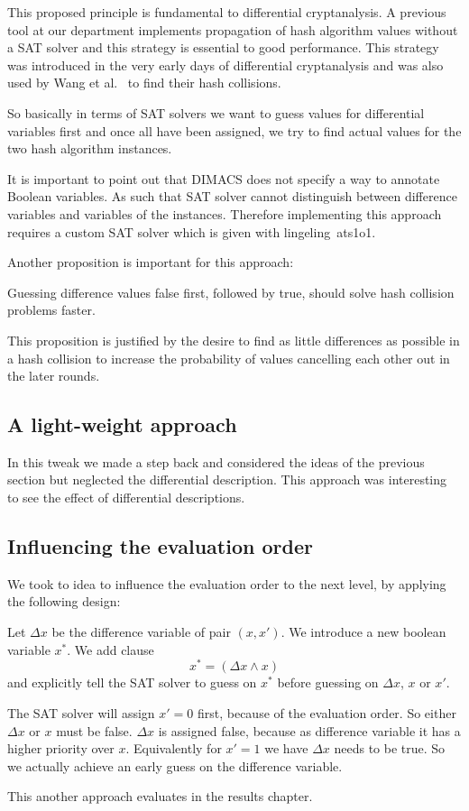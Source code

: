 This proposed principle is fundamental to differential cryptanalysis. A previous tool
at our department implements propagation of hash algorithm values without a SAT solver
and this strategy is essential to good performance. This strategy was introduced
in the very early days of differential cryptanalysis and was also used by Wang et
al.~\cite{wang2004} to find their hash collisions.

So basically in terms of SAT solvers we want to guess values for differential variables
first and once all have been assigned, we try to find actual values for the two
hash algorithm instances.

It is important to point out that DIMACS does not specify a way to annotate Boolean
variables. As such that SAT solver cannot distinguish between difference variables
and variables of the instances. Therefore implementing this approach requires a custom
SAT solver which is given with lingeling~ats1o1.

Another proposition is important for this approach:

\begin{prop}
  Guessing difference values false first, followed by true,
  should solve hash collision problems faster.
\end{prop}

This proposition is justified by the desire to find as little differences as possible
in a hash collision to increase the probability of values cancelling each other out
in the later rounds.

\subsection{A light-weight approach}
\label{sec:enc-ocnf}
%
In this tweak we made a step back and considered the ideas of the previous
section but neglected the differential description. This approach was interesting
to see the effect of differential descriptions.

\subsection{Influencing the evaluation order}
\label{sec:enc-diff-desc-eo}
%
We took to idea to influence the evaluation order to the next level,
by applying the following design:

Let $\Delta x$ be the difference variable of pair $(x, x')$. We introduce a new boolean
variable $x^*$. We add clause
\[ x^* = (\Delta x \land x) \]
and explicitly tell the SAT solver to guess on $x^*$ before guessing on $\Delta x$, $x$ or $x'$.

The SAT solver will assign $x'=0$ first, because of the evaluation order. So either $\Delta x$
or $x$ must be false. $\Delta x$ is assigned false, because as difference variable it has a higher
priority over $x$. Equivalently for $x'=1$ we have $\Delta x$ needs to be true. So we actually
achieve an early guess on the difference variable.

This another approach evaluates in the results chapter.

